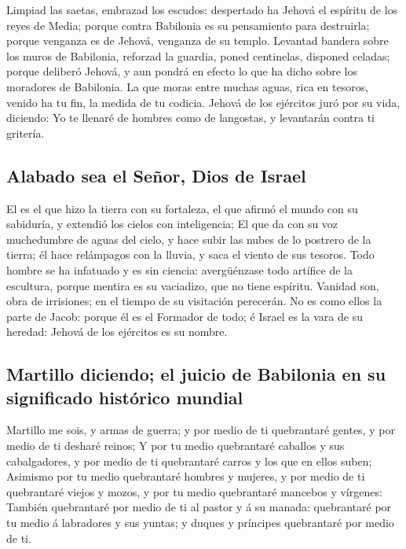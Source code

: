  Limpiad las saetas, embrazad los escudos: despertado ha
Jehová el espíritu de los reyes de Media; porque contra Babilonia es su
pensamiento para destruirla; porque venganza es de Jehová, venganza de
su templo.  Levantad bandera sobre los muros de
Babilonia, reforzad la guardia, poned centinelas, disponed celadas;
porque deliberó Jehová, y aun pondrá en efecto lo que ha dicho sobre los
moradores de Babilonia.  La que moras entre muchas aguas,
rica en tesoros, venido ha tu fin, la medida de tu codicia.
 Jehová de los ejércitos juró por su vida, diciendo: Yo
te llenaré de hombres como de langostas, y levantarán contra ti
gritería.

\hypertarget{alabado-sea-el-seuxf1or-dios-de-israel}{%
\subsection{Alabado sea el Señor, Dios de
Israel}\label{alabado-sea-el-seuxf1or-dios-de-israel}}

 El es el que hizo la tierra con su fortaleza, el que
afirmó el mundo con su sabiduría, y extendió los cielos con
inteligencia;  El que da con su voz muchedumbre de aguas
del cielo, y hace subir las nubes de lo postrero de la tierra; él hace
relámpagos con la lluvia, y saca el viento de sus tesoros.
 Todo hombre se ha infatuado y es sin ciencia:
avergüénzase todo artífice de la escultura, porque mentira es su
vaciadizo, que no tiene espíritu.  Vanidad son, obra de
irrisiones; en el tiempo de su visitación perecerán.  No
es como ellos la parte de Jacob: porque él es el Formador de todo; é
Israel es la vara de su heredad: Jehová de los ejércitos es su nombre.

\hypertarget{martillo-diciendo-el-juicio-de-babilonia-en-su-significado-histuxf3rico-mundial}{%
\subsection{Martillo diciendo; el juicio de Babilonia en su significado
histórico
mundial}\label{martillo-diciendo-el-juicio-de-babilonia-en-su-significado-histuxf3rico-mundial}}

 Martillo me sois, y armas de guerra; y por medio de ti
quebrantaré gentes, y por medio de ti desharé reinos;  Y
por tu medio quebrantaré caballos y sus cabalgadores, y por medio de ti
quebrantaré carros y los que en ellos suben;  Asimismo
por tu medio quebrantaré hombres y mujeres, y por medio de ti
quebrantaré viejos y mozos, y por tu medio quebrantaré mancebos y
vírgenes:  También quebrantaré por medio de ti al pastor
y á su manada: quebrantaré por tu medio á labradores y sus yuntas; y
duques y príncipes quebrantaré por medio de ti.

